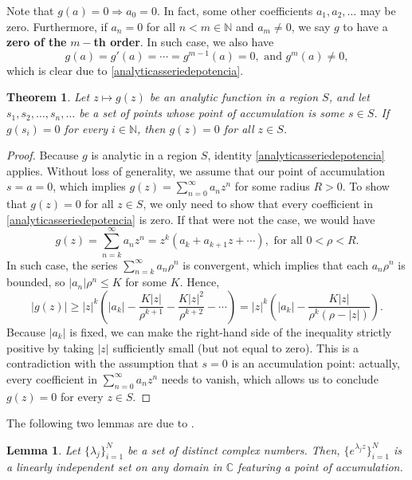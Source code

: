 \documentclass[12pt]{report} %
\newtheorem{theorem}{Theorem}
\newtheorem{lemma}{Lemma}
\newcommand{\tmstrong}[1]{\textbf{#1}}
\begin{document}
Note that $g (a) = 0 \Rightarrow a_0 = 0$. In fact, some other coefficients
$a_1, a_2, \ldots$ may be zero. Furthermore, if $a_n = 0$ for all $n < m \in
\mathbb{N}$ and $a_m \neq 0$, we say $g$ to have a {\tmstrong{zero of the }}$m
-${\tmstrong{th order}}. In such case, we also have
\[ g (a) = g' (a) = \cdots = g^{m - 1} (a) = 0, \text{ and } g^m (a) \neq 0,
\]
which is clear due to \eqref{analyticasseriedepotencia}.

\begin{theorem}
  \label{theorem-titschmarch}Let $z \mapsto g (z)$ be an analytic function in
  a region $S$, and let $s_1, s_2, \ldots, s_n, \ldots$ be a set of points
  whose point of accumulation is some $s \in S$. If $g (s_i) = 0$ for every $i
  \in \mathbb{N}$, then $g (z) = 0$ for all $z \in S$.
\end{theorem}

\begin{proof}
  Because $g$ is analytic in a region $S$, identity
  \eqref{analyticasseriedepotencia} applies. Without loss of generality, we
  assume that our point of accumulation $s = a = 0$, which implies $g (z) =
  \sum_{n = 0}^{\infty} a_n z^n$ for some radius $R > 0$. To show that $g (z)
  = 0$ for all $z \in S$, we only need to show that every coefficient in
  \eqref{analyticasseriedepotencia} is zero. If that were not the case, we
  would have
  \[ g (z) = \sum_{n = k}^{\infty} a_n z^n = z^k (a_k + a_{k + 1} z + \cdots),
     \text{ for all } 0 < \rho < R. \]
  In such case, the series $\sum_{n = k}^{\infty} a_n \rho^n$ is convergent,
  which implies that each $a_n \rho^n$ is bounded, so $| a_n | \rho^n \leq K$
  for some $K$. Hence,
  \[ | g (z) | \geq | z |^k \left( | a_k | - \frac{K | z |}{\rho^{k + 1}} -
     \frac{K | z |^2}{\rho^{k + 2}} - \cdots \right) = | z |^k \left( | a_k |
     - \frac{K | z |}{\rho^k (\rho - | z |)} \right) . \]
  Because $| a_k |$ is fixed, we can make the right-hand side of the
  inequality strictly positive by taking $| z |$ sufficiently small (but not
  equal to zero). This is a contradiction with the assumption that $s = 0$ is
  an accumulation point: actually, every coefficient in $\sum_{n = 0}^{\infty}
  a_n z^n$ needs to vanish, which allows us to conclude $g (z) = 0$ for every
  $z \in S$.
\end{proof}

The following two lemmas are due to {\cite{cheneylight2009course}}.

\begin{lemma}
  \label{lemma-linearly-independent-set-featuring-accumulation}Let $\{
  \lambda_j \}_{i = 1}^N$ be a set of distinct complex numbers. Then, $\{
  e^{\lambda_j z} \}_{i = 1}^N$ is a linearly independent set on any domain in
  $\mathbb{C}$ featuring a point of accumulation.
\end{lemma}
\end{document}
